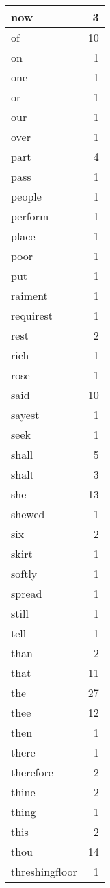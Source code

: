 \begin{center}
\begin{longtable}{l|r}
now & 3 \\ \hline
of & 10 \\ \hline
on & 1 \\ \hline
one & 1 \\ \hline
or & 1 \\ \hline
our & 1 \\ \hline
over & 1 \\ \hline
part & 4 \\ \hline
pass & 1 \\ \hline
people & 1 \\ \hline
perform & 1 \\ \hline
place & 1 \\ \hline
poor & 1 \\ \hline
put & 1 \\ \hline
raiment & 1 \\ \hline
requirest & 1 \\ \hline
rest & 2 \\ \hline
rich & 1 \\ \hline
rose & 1 \\ \hline
said & 10 \\ \hline
sayest & 1 \\ \hline
seek & 1 \\ \hline
shall & 5 \\ \hline
shalt & 3 \\ \hline
she & 13 \\ \hline
shewed & 1 \\ \hline
six & 2 \\ \hline
skirt & 1 \\ \hline
softly & 1 \\ \hline
spread & 1 \\ \hline
still & 1 \\ \hline
tell & 1 \\ \hline
than & 2 \\ \hline
that & 11 \\ \hline
the & 27 \\ \hline
thee & 12 \\ \hline
then & 1 \\ \hline
there & 1 \\ \hline
therefore & 2 \\ \hline
thine & 2 \\ \hline
thing & 1 \\ \hline
this & 2 \\ \hline
thou & 14 \\ \hline
threshingfloor & 1 \\ \hline

\end{longtable}
\end{center}
